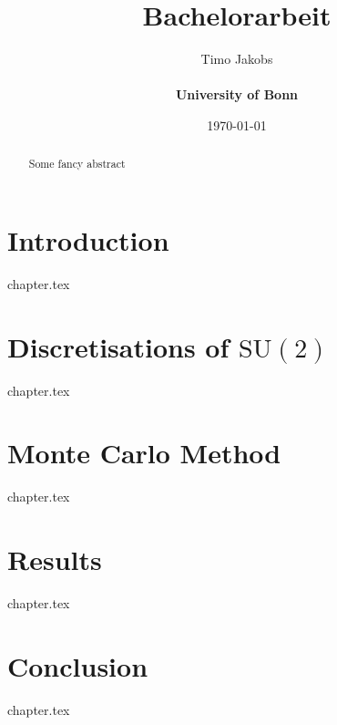 \documentclass[a4paper]{scrartcl}
\title{Bachelorarbeit}
\author{Timo Jakobs \\\\ \textbf{University of Bonn}}
\date{\today}
\newcommand{\SUTwo}{$\mathrm{SU}(2)$}
\begin{document}
\maketitle

\begin{abstract}
Some fancy abstract
\end{abstract}

\tableofcontents
\newpage

\section{Introduction}
{chapter.tex}

\section{Discretisations of \SUTwo}
\label{sec:discSu2}
{chapter.tex}

\section{Monte Carlo Method}
{chapter.tex}

\section{Results}
\label{sec:results}
{chapter.tex}

\section{Conclusion}
\label{sec:conclusion}
{chapter.tex}

\printbibliography

\begin{appendix}

\end{appendix}
\end{document}
